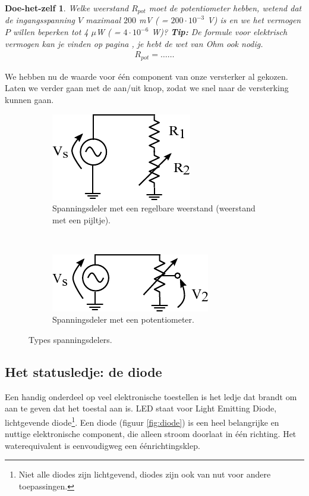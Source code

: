 \documentclass{article}
\newtheorem{DIY}{Doe-het-zelf}
\begin{document}
			\begin{DIY} Welke weerstand $R_{pot}$ moet de potentiometer hebben, wetend dat de ingangsspanning $V$ maximaal $200$ mV ( = $200 \cdot 10^{-3}$ V) is en we het vermogen $P$ willen beperken tot 4 $\mu$W ( = $4 \cdot 10^{-6}$ W)? \textbf{Tip:} De formule voor elektrisch vermogen kan je vinden op pagina \pageref{eq:vermogen},  je hebt de wet van Ohm ook nodig.
			\begin{align*}
			    R_{pot} = \ldots\ldots
			\end{align*}
			\end{DIY}			

			We hebben nu de waarde voor \'e\'en component van onze versterker al gekozen. Laten we verder gaan met de aan/uit knop, zodat we snel naar de versterking kunnen gaan.
			\begin{figure}
				\centering
				\begin{subfigure}[b]{0.45\linewidth}
					\centering
					\includegraphics{regelbareR}
					\caption{Spanningsdeler met een regelbare weerstand (weerstand met een pijltje).}
					\label{subfig:regelbareR}
				\end{subfigure}
				~
				\begin{subfigure}[b]{0.45\linewidth}
					\centering
					\includegraphics{potentiometer.pdf}
					\caption{Spanningsdeler met een potentiometer.}
					\label{subfig:pot}
				\end{subfigure}
			\caption{Types spanningsdelers.}
			\label{fig:vdeler} 
			\end{figure}

		\subsection{Het statusledje: de diode}
			Een handig onderdeel op veel elektronische toestellen is het ledje dat brandt om aan te geven dat het toestal aan is. LED staat voor Light Emitting Diode, lichtgevende diode\footnote{Niet alle diodes zijn lichtgevend, diodes zijn ook van nut voor andere toepassingen.}. Een diode (figuur \ref{fig:diode}) is een heel belangrijke en nuttige elektronische component, die alleen stroom doorlaat in \'e\'en richting. Het waterequivalent is eenvoudigweg een \'e\'enrichtingsklep.
\end{document}
